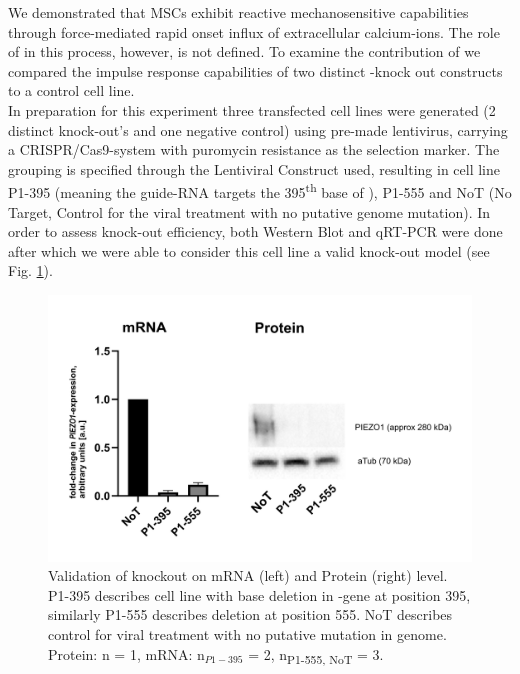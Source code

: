 We demonstrated that MSCs exhibit reactive mechanosensitive capabilities through force-mediated rapid onset influx of extracellular calcium-ions. The role of \Piezo{} in this process, however, is not defined. To examine the contribution of \Piezo{} we compared the impulse response capabilities of two distinct \Piezo{}-knock out constructs to a control cell line.\\
In preparation for this experiment three transfected cell lines were generated (2 distinct \Piezo{} knock-out's and one negative control) using pre-made lentivirus, carrying a CRISPR/Cas9-system with puromycin resistance as the selection marker. The grouping is specified through the Lentiviral Construct used, resulting in cell line P1-395 (meaning the guide-RNA targets the 395\textsuperscript{th} base of \PiezoGene{}), P1-555 and NoT (No Target, Control for the viral treatment with no putative genome mutation). In order to assess knock-out efficiency, both Western Blot and qRT-PCR were done after which we were able to consider this cell line a valid knock-out model (see Fig. \ref{fig:KO-Verification}).\\

\begin{figure}
	\centering
	\includegraphics[width=\linewidth]{Piezo1KO_Verification_WBandPCR.png}
	\caption{Validation of knockout on mRNA (left) and Protein (right) level. P1-395 describes cell line with base deletion in \PiezoGene{}-gene at position 395, similarly P1-555 describes deletion at position 555. NoT describes control for viral treatment with no putative mutation in genome. Protein: n = 1, mRNA:  n$_{P1-395}$ = 2, n\textsubscript{P1-555, NoT} = 3.}
	\label{fig:KO-Verification}
\end{figure}

